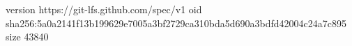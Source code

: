 version https://git-lfs.github.com/spec/v1
oid sha256:5a0a2141f13b199629e7005a3bf2729ca310bda5d690a3bdfd42004c24a7c895
size 43840
